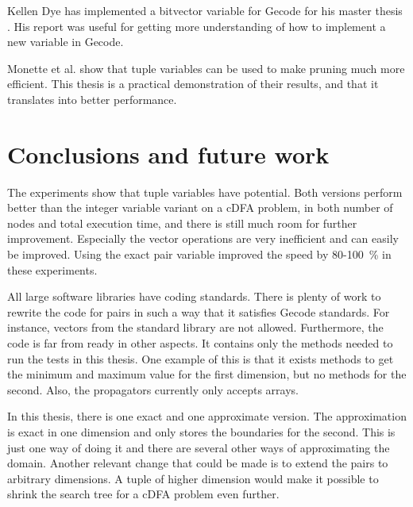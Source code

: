 \documentclass[a4paper,11pt]{article}
\begin{document}
Kellen Dye has implemented a bitvector variable for Gecode for his master thesis \cite{Dye761927}. His report was useful for getting more understanding of how to implement a new variable in Gecode.

Monette et al.\cite{Monette771427} show that tuple variables can be used to make pruning much more efficient. This thesis is a practical demonstration of their results, and that it translates into better performance.

\section{Conclusions and future work}
The experiments show that tuple variables have potential. Both versions perform better than the integer variable variant on a cDFA problem, in both number of nodes and total execution time, and there is still much room for further improvement. Especially the vector operations are very inefficient and can easily be improved. Using the exact pair variable improved the speed by 80-\SI{100}{\percent} in these experiments.

All large software libraries have coding standards. There is plenty of work to rewrite the code for pairs in such a way that it satisfies Gecode standards. For instance, vectors from the standard library are not allowed. Furthermore, the code is far from ready in other aspects. It contains only the methods needed to run the tests in this thesis. One example of this is that it exists methods to get the minimum and maximum value for the first dimension, but no methods for the second. Also, the propagators currently only accepts arrays. 

In this thesis, there is one exact and one approximate version. The approximation is exact in one dimension and only stores the boundaries for the second. This is just one way of doing it and there are several other ways of approximating the domain. Another relevant change that could be made is to extend the pairs to arbitrary dimensions. A tuple of higher dimension would make it possible to shrink the search tree for a cDFA problem even further.





%
%
%
%
\end{document}
